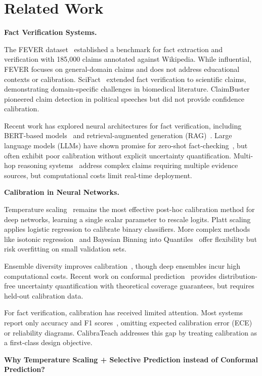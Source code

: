 \section{Related Work}\label{related-work}

\textbf{Fact Verification Systems.}

The FEVER dataset~ established a benchmark for fact extraction and verification with 185,000 claims annotated against Wikipedia. While influential, FEVER focuses on general-domain claims and does not address educational contexts or calibration. SciFact~ extended fact verification to scientific claims, demonstrating domain-specific challenges in biomedical literature. ClaimBuster~ pioneered claim detection in political speeches but did not provide confidence calibration.

Recent work has explored neural architectures for fact verification, including BERT-based models~ and retrieval-augmented generation (RAG)~. Large language models (LLMs) have shown promise for zero-shot fact-checking~, but often exhibit poor calibration without explicit uncertainty quantification. Multi-hop reasoning systems~ address complex claims requiring multiple evidence sources, but computational costs limit real-time deployment.

\textbf{Calibration in Neural Networks.}

Temperature scaling~ remains the most effective post-hoc calibration method for deep networks, learning a single scalar parameter to rescale logits. Platt scaling~ applies logistic regression to calibrate binary classifiers. More complex methods like isotonic regression~ and Bayesian Binning into Quantiles~ offer flexibility but risk overfitting on small validation sets.

Ensemble diversity improves calibration~, though deep ensembles incur high computational costs. Recent work on conformal prediction~ provides distribution-free uncertainty quantification with theoretical coverage guarantees, but requires held-out calibration data.

For fact verification, calibration has received limited attention. Most systems report only accuracy and F1 scores~, omitting expected calibration error (ECE) or reliability diagrams. CalibraTeach addresses this gap by treating calibration as a first-class design objective.

\textbf{Why Temperature Scaling + Selective Prediction instead of Conformal Prediction?}

